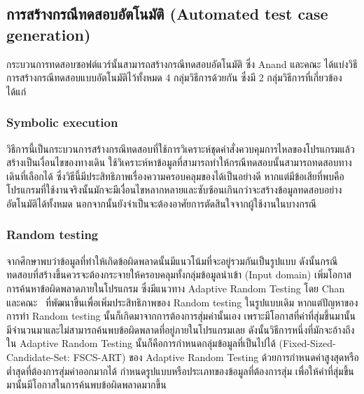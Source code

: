 \subsection{การสร้างกรณีทดสอบอัตโนมัติ (Automated test case generation)}
\label{sub:tcgen}

กระบวนการทดสอบซอฟต์แวร์นั้นสามารถสร้างกรณีทดสอบอัตโนมัติ ซึ่ง Anand และคณะ \cite{Anand2013} ได้แบ่งวิธีการสร้างกรณีทดสอบแบบอัตโนมัติไว้ทั้งหมด 
4 กลุ่มวิธีการด้วยกัน ซึ่งมี 2 กลุ่มวิธีการที่เกี่ยวข้องได้แก่

\subsubsection{Symbolic execution}
\label{sub:tcgen:sub:symbolic}

วิธีการนี้เป็นกระบวนการสร้างกรณีทดสอบที่ใช้การวิเคราะห์ชุดคำสั่งควบคุมการไหลของโปรแกรมแล้วสร้างเป็นเงื่อนไขของทางเดิน 
ใช้วิเคราะห์หาข้อมูลที่สามารถทำให้กรณีทดสอบนั้นสามารถทดสอบทางเดินที่เลือกได้ ซึ่งวิธีนี้มีประสิทธิภาพเรื่องความครอบคลุมของ{\sourcecode}ได้เป็นอย่างดี
หากแต่มีข้อเสียที่พบคือ โปรแกรมที่ใช้งานจริงนั้นมักจะมีเงื่อนไขหลากหลายและซับซ้อนเกินกว่าจะสร้างข้อมูลทดสอบอย่างอัตโนมัติได้ทั้งหมด 
นอกจากนั้นยังจำเป็นจะต้องอาศัยการตัดสินใจจากผู้ใช้งานในบางกรณี

\subsubsection{Random testing}
\label{sub:tcgen:sub:random}

จากศึกษาพบว่าข้อมูลที่ทำให้เกิดข้อผิดพลาดนั้นมีแนวโน้มที่จะอยู่รวมกันเป็นรูปแบบ %
ดังนั้นกรณีทดสอบที่สร้างขึ้นควรจะต้องกระจายให้ครอบคลุมทั้งกลุ่มข้อมูลนำเข้า (Input domain) เพิ่มโอกาสการค้นหาข้อผิดพลาดภายในโปรแกรม 
ซึ่งมีแนวทาง Adaptive Random Testing โดย Chan และคณะ \cite{Chan2004}\ ที่พัฒนาขึ้นเพื่อเพิ่มประสิทธิภาพของ Random testing ในรูปแบบเดิม 
หากแต่ปัญหาของการทำ Random testing นั้นก็เกิดมาจากการต้องการสุ่มค่านั้นเอง 
เพราะมีโอกาสที่ค่าที่สุ่มขึ้นมานั้นมีจำนวนมาและไม่สามารถค้นพบข้อผิดพลาดที่อยู่ภายในโปรแกรมเลย ดังนั้นวิธีการหนึ่งที่มักจะอ้างถึงใน Adaptive Random Testing 
นั้นก็คือการกำหนดกลุ่มข้อมูลที่เป็นไปได้ (Fixed-Sized-Candidate-Set: FSCS-ART) ของ Adaptive Random Testing 
ด้วยการกำหนดค่าสูงสุดหรือต่ำสุดที่ต้องการสุ่มค่าออกมากได้ กำหนดรูปแบบหรือประเภทของข้อมูลที่ต้องการสุ่ม 
เพื่อให้ค่าที่สุ่มขึ้นมานั้นมีโอกาสในการค้นพบข้อผิดพลาดมากขึ้น %
